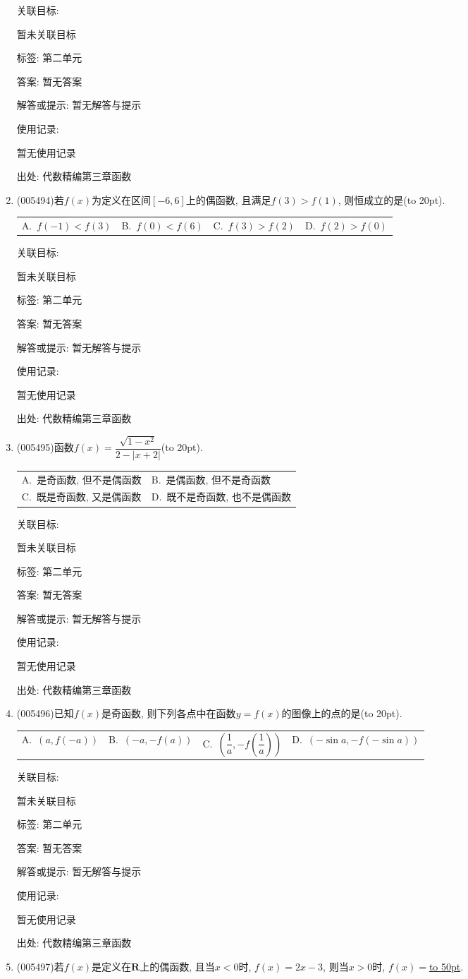 \documentclass[10pt,a4paper]{article}
\newcommand{\blank}[1]{\underline{\hbox to #1pt{}}}
\newcommand{\bracket}[1]{(\hbox to #1pt{})}
\newcommand{\twoch}[4]{\par\begin{tabular}{p{.46\textwidth}p{.46\textwidth}}
A.~#1& B.~#2\\
C.~#3& D.~#4
\end{tabular}}
\newcommand{\fourch}[4]{\par\begin{tabular}{p{.23\textwidth}p{.23\textwidth}p{.23\textwidth}p{.23\textwidth}}
A.~#1 &B.~#2& C.~#3& D.~#4
\end{tabular}}
\begin{document}
\begin{enumerate}[1.]
关联目标:

暂未关联目标



标签: 第二单元

答案: 暂无答案

解答或提示: 暂无解答与提示

使用记录:

暂无使用记录


出处: 代数精编第三章函数
\item { (005494)}若$f(x)$为定义在区间$[-6, 6]$上的偶函数, 且满足$f(3)>f(1)$, 则恒成立的是\bracket{20}.
\fourch{$f(-1)<f(3)$}{$f(0)<f(6)$}{$f(3)>f(2)$}{$f(2)>f(0)$}


关联目标:

暂未关联目标



标签: 第二单元

答案: 暂无答案

解答或提示: 暂无解答与提示

使用记录:

暂无使用记录


出处: 代数精编第三章函数
\item { (005495)}函数$f(x)=\dfrac{\sqrt {1-x^2}}{2-|x+2|}$\bracket{20}.
\twoch{是奇函数, 但不是偶函数}{是偶函数, 但不是奇函数}{既是奇函数, 又是偶函数}{既不是奇函数, 也不是偶函数}


关联目标:

暂未关联目标



标签: 第二单元

答案: 暂无答案

解答或提示: 暂无解答与提示

使用记录:

暂无使用记录


出处: 代数精编第三章函数
\item { (005496)}已知$f(x)$是奇函数, 则下列各点中在函数$y=f(x)$的图像上的点的是\bracket{20}.
\fourch{$(a,f(-a))$}{$(-a,-f(a))$}{$(\dfrac 1a,-f(\dfrac 1a))$}{$(-\sin a,-f(-\sin a))$}


关联目标:

暂未关联目标



标签: 第二单元

答案: 暂无答案

解答或提示: 暂无解答与提示

使用记录:

暂无使用记录


出处: 代数精编第三章函数
\item { (005497)}若$f(x)$是定义在$\mathbf{R}$上的偶函数, 且当$x<0$时, $f(x)=2x-3$, 则当$x>0$时, $f(x)=$\blank{50}.



\end{enumerate}
\end{document}

